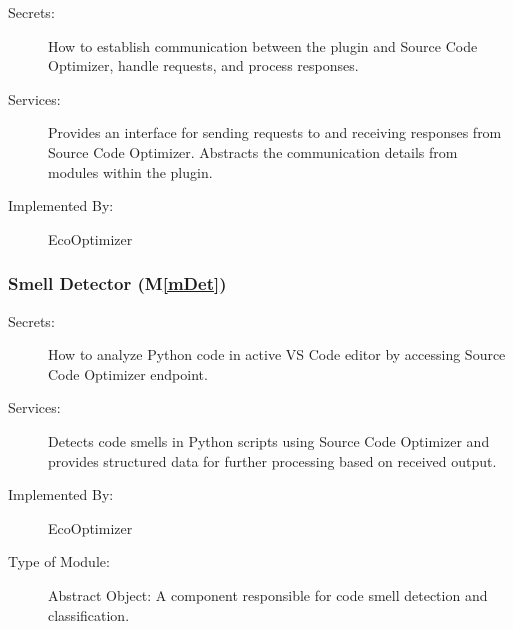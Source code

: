 \documentclass[12pt, titlepage]{article}
\newcommand{\mref}[1]{M\ref{#1}}
\begin{document}

\begin{description}
    \item[Secrets:] How to establish communication between the plugin and Source Code Optimizer, handle requests, and process responses.
    \item[Services:] Provides an interface for sending requests to and receiving responses from Source Code Optimizer. Abstracts the communication details from modules within the plugin.
    \item[Implemented By:] EcoOptimizer
\end{description}

\subsubsection{Smell Detector (\mref{mDet})}


\begin{description}
    \item[Secrets:] How to analyze Python code in active VS Code editor by accessing Source Code Optimizer endpoint.
    \item[Services:] Detects code smells in Python scripts using Source Code Optimizer and provides structured data for further processing based on received output.
    \item[Implemented By:] EcoOptimizer
    \item[Type of Module:] Abstract Object: A component responsible for code smell detection and classification.
\end{description}
\end{document}
